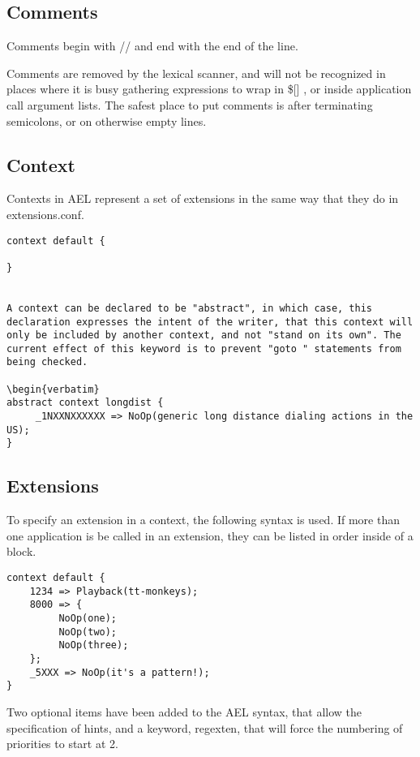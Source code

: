 {\subsection{Comments}

Comments begin with // and end with the end of the line.

Comments are removed by the lexical scanner, and will not be
recognized in places where it is busy gathering expressions to wrap in
\$[] , or inside application call argument lists. The safest place to put
comments is after terminating semicolons, or on otherwise empty lines.


\subsection{Context}

Contexts in AEL represent a set of extensions in the same way that
they do in extensions.conf.

\begin{verbatim}
context default {

}


A context can be declared to be "abstract", in which case, this
declaration expresses the intent of the writer, that this context will
only be included by another context, and not "stand on its own". The
current effect of this keyword is to prevent "goto " statements from
being checked.

\begin{verbatim}
abstract context longdist {
     _1NXXNXXXXXX => NoOp(generic long distance dialing actions in the US);
}
\end{verbatim}


\subsection{Extensions}

To specify an extension in a context, the following syntax is used. If
more than one application is be called in an extension, they can be
listed in order inside of a block.

\begin{verbatim}
context default {
    1234 => Playback(tt-monkeys);
    8000 => {
         NoOp(one);
         NoOp(two);
         NoOp(three);
    };
    _5XXX => NoOp(it's a pattern!);
}
\end{verbatim}

Two optional items have been added to the AEL syntax, that allow the
specification of hints, and a keyword, regexten, that will force the
numbering of priorities to start at 2.

}
